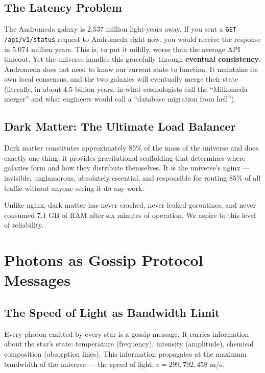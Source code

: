 \documentclass[12pt,a4paper]{article}
\begin{document}
\subsection{The Latency Problem}

The Andromeda galaxy is 2.537 million light-years away. If you sent a
\texttt{GET /api/v1/status} request to Andromeda right now, you would
receive the response in 5.074 million years. This is, to put it mildly,
worse than the average API timeout. Yet the universe handles this gracefully
through \textbf{eventual consistency}. Andromeda does not need to know our
current state to function. It maintains its own local consensus, and the
two galaxies will eventually merge their state (literally, in about
4.5 billion years, in what cosmologists call the ``Milkomeda merger''
and what engineers would call a ``database migration from hell'').

\subsection{Dark Matter: The Ultimate Load Balancer}

Dark matter constitutes approximately 85\% of the mass of the universe
and does exactly one thing: it provides gravitational scaffolding that
determines where galaxies form and how they distribute themselves.
It is the universe's nginx --- invisible, unglamorous, absolutely essential,
and responsible for routing 85\% of all traffic without anyone seeing it do
any work.

Unlike nginx, dark matter has never crashed, never leaked goroutines,
and never consumed 7.1 GB of RAM after six minutes of operation. We
aspire to this level of reliability.

\section{Photons as Gossip Protocol Messages}

\subsection{The Speed of Light as Bandwidth Limit}

Every photon emitted by every star is a gossip message. It carries information
about the star's state: temperature (frequency), intensity (amplitude), chemical
composition (absorption lines). This information propagates at the maximum
bandwidth of the universe --- the speed of light, $c = 299{,}792{,}458$ m/s.
\end{document}
